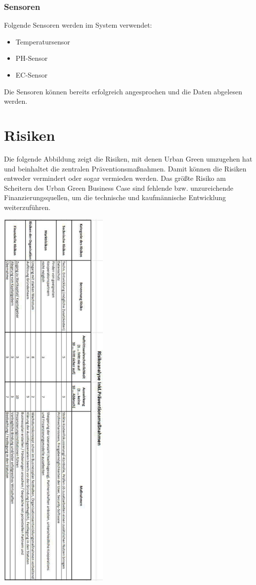 \documentclass[11pt]{article}
\begin{document}
\subsubsection{Sensoren}

Folgende Sensoren werden im System verwendet:

\begin{itemize}
	\item Temperatursensor
	\item PH-Sensor
	\item EC-Sensor
\end{itemize}

Die Sensoren k\"onnen bereits erfolgreich angesprochen und die Daten abgelesen werden.

\section{Risiken}

Die folgende Abbildung zeigt die Risiken, mit denen Urban Green umzugehen hat und beinhaltet die zentralen Pr\"aventionsma{\ss}nahmen. Damit k\"onnen die Risiken entweder vermindert oder sogar vermieden werden. Das grö{\ss}te Risiko am Scheitern des Urban Green Business Case sind fehlende bzw. unzureichende Finanzierungsquellen, um die technische und kaufm\"annische Entwicklung weiterzuf\"uhren.\\

\begin{center}
	\includegraphics[angle=90,width=5.3cm]{risiken}
\end{center}
\end{document}
